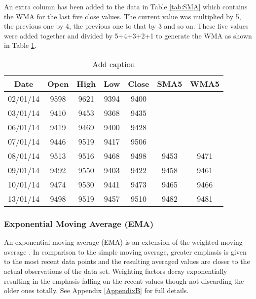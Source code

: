 An extra column has been added to the data in Table \ref{tab:SMA} which contains the WMA for the last five close values. The current value was multiplied by 5, the previous one by 4, the previous one to that by 3 and so on. These five values were added together and divided by 5+4+3+2+1 to generate the WMA as shown in Table \ref{tab:WMA}.

\begin{table}[htbp]
  \centering
  \caption{Add caption}
    \begin{tabular}{ccccccc}
    \toprule
    \textbf{Date} & \textbf{Open} & \textbf{High} & \textbf{Low} & \textbf{Close} & \textbf{SMA5} & \textbf{WMA5} \\
    \midrule
    02/01/14 & 9598  & 9621  & 9394  & 9400  &       &  \\
    03/01/14 & 9410  & 9453  & 9368  & 9435  &       &  \\
    06/01/14 & 9419  & 9469  & 9400  & 9428  &       &  \\
    07/01/14 & 9446  & 9519  & 9417  & 9506  &       &  \\
    08/01/14 & 9513  & 9516  & 9468  & 9498  & 9453  & 9471 \\
    09/01/14 & 9492  & 9550  & 9403  & 9422  & 9458  & 9461 \\
    10/01/14 & 9474  & 9530  & 9441  & 9473  & 9465  & 9466 \\
    13/01/14 & 9498  & 9519  & 9457  & 9510  & 9482  & 9481 \\
    \bottomrule
    \end{tabular}%
  \label{tab:WMA}%
\end{table}%

\subsubsection{Exponential Moving Average (EMA)}
An exponential moving average (EMA) is an extension of the weighted moving average \citep{Ord20041}. In comparison to the simple moving average, greater emphasis is given to the most recent data points and the resulting averaged values are closer to the actual observations of the data set. Weighting factors decay exponentially resulting in the emphasis falling on the recent values though not discarding the older ones totally. See Appendix \ref{AppendixB} for full details.

